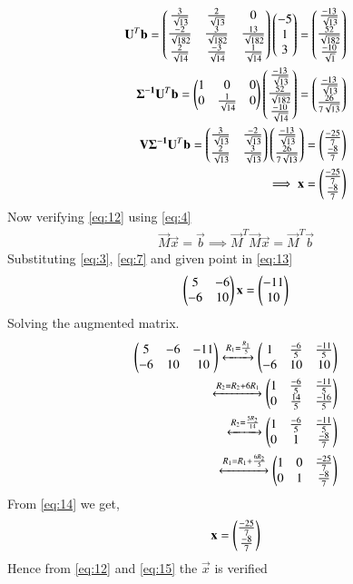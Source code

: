 \documentclass[journal,12pt,twocolumn]{IEEEtran}
\begin{document}
\begin{align}
\mathbf{U}^T\mathbf{b}=\begin{pmatrix}\frac{3}{\sqrt{13}}&\frac{2}{\sqrt{13}}&0\\\frac{-2}{\sqrt{182}}&\frac{3}{\sqrt{182}}&\frac{13}{\sqrt{182}}\\\frac{2}{\sqrt{14}}&\frac{-3}{\sqrt{14}}&\frac{1}{\sqrt{14}}\end{pmatrix}\begin{pmatrix}-5\\1\\3\end{pmatrix} = \begin{pmatrix}\frac{-13}{\sqrt{13}}\\\frac{52}{\sqrt{182}}\\\frac{-10}{\sqrt{1}}\end{pmatrix}\\
\mathbf{\Sigma^{-1}}\mathbf{U}^T\mathbf{b}=\begin{pmatrix}1&0&0\\0&\frac{1}{\sqrt{14}}&0\end{pmatrix}\begin{pmatrix}\frac{-13}{\sqrt{13}}\\\frac{52}{\sqrt{182}}\\\frac{-10}{\sqrt{14}}\end{pmatrix}=\begin{pmatrix}\frac{-13}{\sqrt{13}}\\\frac{26}{7\sqrt{13}}\end{pmatrix}\\
\mathbf{V}\mathbf{\Sigma^{-1}}\mathbf{U}^T\mathbf{b}=\begin{pmatrix}\frac{3}{\sqrt{13}}&\frac{-2}{\sqrt{13}}\\\frac{2}{\sqrt{13}}&\frac{3}{\sqrt{13}}\end{pmatrix}\begin{pmatrix}\frac{-13}{\sqrt{13}}\\\frac{26}{7\sqrt{13}}\end{pmatrix}=\begin{pmatrix}\frac{-25}{7}\\\frac{-8}{7}\end{pmatrix}\\
\implies\mathbf{x}=\begin{pmatrix}\frac{-25}{7}\\\frac{-8}{7}\end{pmatrix}\label{eq:12}
\end{align}
Now verifying \eqref{eq:12} using \eqref{eq:4}
\begin{align}
\vec{M}\vec{x}=\vec{b}
\implies\vec{M}^T\vec{M}\vec{x} = \vec{M}^T\vec{b}\label{eq:13}
\end{align}
Substituting \eqref{eq:3}, \eqref{eq:7} and given point in \eqref{eq:13}
\begin{align}
\begin{pmatrix}5&-6\\-6&10\end{pmatrix}\mathbf{x} = \begin{pmatrix}-11\\10\end{pmatrix}\\
\end{align}
Solving the augmented matrix.
\begin{align}
\begin{pmatrix}5&-6&-11\\-6&10&10\end{pmatrix}\xleftrightarrow{R_1=\frac{R_1}{5}}\begin{pmatrix}1&\frac{-6}{5}&\frac{-11}{5}\\-6&10&10\end{pmatrix}\\
\xleftrightarrow{R_2=R_2+6R_1}\begin{pmatrix}1&\frac{-6}{5}&\frac{-11}{5}\\0&\frac{14}{5}&\frac{-16}{5}\end{pmatrix}\\
\xleftrightarrow{R_2=\frac{5R_2}{14}}\begin{pmatrix}1&\frac{-6}{5}&\frac{-11}{5}\\0&1&\frac{-8}{7}\end{pmatrix}\\
\xleftrightarrow{R_1=R_1+\frac{6R_2}{5}}\begin{pmatrix}1&0&\frac{-25}{7}\\0&1&\frac{-8}{7}\end{pmatrix}\label{eq:14}
\end{align}
From \eqref{eq:14} we get,
\begin{align}
\mathbf{x}=\begin{pmatrix}\frac{-25}{7}\\\frac{-8}{7}\end{pmatrix}\label{eq:15}
\end{align}
Hence from \eqref{eq:12} and \eqref{eq:15} the $\vec{x}$ is verified
\end{document}
